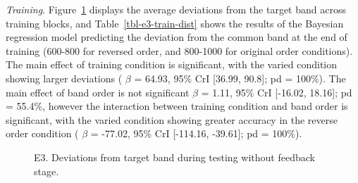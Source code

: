 \documentclass[
  12pt,
  letterpaper,
]{article}
\begin{document}
\emph{Training}. Figure~\ref{fig-e3-train-dev} displays the average
deviations from the target band across training blocks, and
Table~\ref{tbl-e3-train-dist} shows the results of the Bayesian
regression model predicting the deviation from the common band at the
end of training (600-800 for reversed order, and 800-1000 for original
order conditions). The main effect of training condition is significant,
with the varied condition showing larger deviations ( \(\beta\) = 64.93,
95\% CrI {[}36.99, 90.8{]}; pd = 100\%). The main effect of band order
is not significant \(\beta\) = 1.11, 95\% CrI {[}-16.02, 18.16{]}; pd =
55.4\%, however the interaction between training condition and band
order is significant, with the varied condition showing greater accuracy
in the reverse order condition ( \(\beta\) = -77.02, 95\% CrI
{[}-114.16, -39.61{]}; pd = 100\%).

\begin{figure}


\caption{\label{fig-e3-train-dev}E3. Deviations from target band during
testing without feedback stage.}

\end{figure}%
\end{document}
